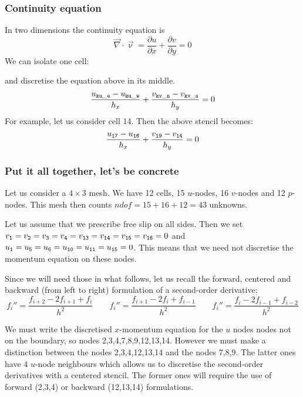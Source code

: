 \subsubsection{Continuity equation}

In two dimensions the continuity equation
is 
\[
\vec\nabla \cdot \vec\upnu 
= 
\frac{\partial u}{\partial x} 
+
\frac{\partial v}{\partial y} 
=0
\]
We can isolate one cell:




and discretise the equation above in its middle.
\[
\frac{u_{\tt ku\_e}-u_{\tt ku\_w}}{h_x} 
+
\frac{v_{\tt kv\_n}-v_{\tt kv\_s}}{h_y} 
=0
\]
For example, let us consider cell 14. Then the above stencil becomes:
\[
\frac{u_{\tt 17}-u_{\tt 16}}{h_x} + \frac{v_{\tt 19}-v_{\tt 14}}{h_y} =0
\]





\subsubsection{Put it all together, let's be concrete}

Let us consider a $4\times 3$ mesh.
We have 12 cells, 15 $u$-nodes, 16 $v$-nodes and 12 $p$-nodes.
This mesh then counts $ndof=15+16+12=43$ unknowns.






Let us assume that we prescribe free slip on all sides.
Then we set $v_{\tt 1}=v_{\tt 2}=v_{\tt 3}=v_{\tt 4}=v_{\tt 13}=v_{\tt 14}=v_{\tt 15}=v_{\tt 16}=0$
and $u_{\tt 1}=u_{\tt 5}=u_{\tt 6}=u_{\tt 10}=u_{\tt 11} = u_{\tt 15}=0$.
This means that we need not discretise the momentum equation on these nodes.



Since we will need those in what follows, let us recall the forward, centered 
and backward (from left to right) formulation of a second-order derivative:
\[
f_i''=\frac{f_{i+2}-2f_{i+1}+f_i}{h^2}
\qquad
f_i''=\frac{f_{i+1}-2f_{i}+f_{i-1}}{h^2}
\qquad
f_i''=\frac{f_{i}-2f_{i-1}+f_{i-2}}{h^2}
\]

We must write the discretised $x$-momentum equation for the $u$ nodes nodes not on the 
boundary, so nodes 2,3,4,7,8,9,12,13,14.
However we must make a distinction between the nodes 2,3,4,12,13,14 and the nodes 7,8,9.
The latter ones have 4 $u$-node neighbours which allows us to discretise the 
second-order derivatives with a 
centered stencil. The former ones will require the use of forward (2,3,4) or backward (12,13,14) formulations.

